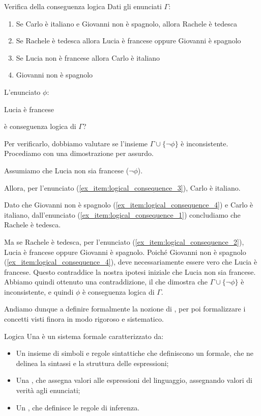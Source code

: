 \begin{example}[label=ex:logical_consequence]{Verifica della conseguenza logica}
  Dati gli enunciati \(\Gamma\):
  \begin{enumerate}
    \item Se Carlo è italiano e Giovanni non è spagnolo, allora Rachele è tedesca\label{ex_item:logical_consequence_1}
    \item Se Rachele è tedesca allora Lucia è francese oppure Giovanni è spagnolo\label{ex_item:logical_consequence_2}
    \item Se Lucia non è francese allora Carlo è italiano\label{ex_item:logical_consequence_3}
    \item Giovanni non è spagnolo\label{ex_item:logical_consequence_4}
  \end{enumerate}
  L'enunciato \(\phi\):
  \begin{center}
    Lucia è francese
  \end{center}
  è conseguenza logica di \(\Gamma\)?
  
  Per verificarlo, dobbiamo valutare se l'insieme \(\Gamma \cup \{\neg \phi\}\) è inconsistente.
  Procediamo con una dimostrazione per assurdo.
  
  Assumiamo che Lucia non sia francese (\(\neg \phi\)).

  Allora, per l'enunciato (\ref{ex_item:logical_consequence_3}), Carlo è italiano. 

  Dato che Giovanni non è spagnolo (\ref{ex_item:logical_consequence_4}) e Carlo è italiano, dall'enunciato (\ref{ex_item:logical_consequence_1}) concludiamo che Rachele è tedesca.

  Ma se Rachele è tedesca, per l'enunciato (\ref{ex_item:logical_consequence_2}), Lucia è francese oppure Giovanni è spagnolo.
  Poiché Giovanni non è spagnolo (\ref{ex_item:logical_consequence_4}), deve necessariamente essere vero che Lucia è francese.
  Questo contraddice la nostra ipotesi iniziale che Lucia non sia francese.
  Abbiamo quindi ottenuto una contraddizione, il che dimostra che \(\Gamma \cup \{\neg \phi\}\) è inconsistente, e quindi \(\phi\) è conseguenza logica di \(\Gamma\).
\end{example}

Andiamo dunque a definire formalmente la nozione di , per poi formalizzare i concetti visti finora in modo rigoroso e sistematico.

\begin{definition}{Logica}
  Una  è un sistema formale caratterizzato da:
  \begin{itemize}
    \item Un insieme di simboli e regole sintattiche che definiscono un  formale, che ne delinea la sintassi e la struttura delle espressioni;
    \item Una , che assegna valori alle espressioni del linguaggio, assegnando valori di verità agli enunciati;
    \item Un , che definisce le regole di inferenza.
  \end{itemize}
\end{definition}

